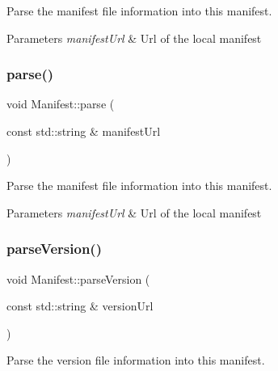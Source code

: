 Parse the manifest file information into this manifest. 


\begin{DoxyParams}{Parameters}
{\em manifest\+Url} & Url of the local manifest \\
\hline
\end{DoxyParams}
\mbox{\label{classManifest_abbaa9d1b3e86c2ff26d60a4d94209cd7}} 
\subsubsection{\texorpdfstring{parse()}{parse()}\hspace{0.1cm}{\footnotesize\ttfamily [2/2]}}
{\footnotesize\ttfamily void Manifest\+::parse (\begin{DoxyParamCaption}\item[{const std\+::string \&}]{manifest\+Url }\end{DoxyParamCaption})\hspace{0.3cm}{\ttfamily [protected]}}



Parse the manifest file information into this manifest. 


\begin{DoxyParams}{Parameters}
{\em manifest\+Url} & Url of the local manifest \\
\hline
\end{DoxyParams}
\mbox{\label{classManifest_adf48429fda66eba3c19db8fc09f7f6d2}} 
\subsubsection{\texorpdfstring{parse\+Version()}{parseVersion()}\hspace{0.1cm}{\footnotesize\ttfamily [1/2]}}
{\footnotesize\ttfamily void Manifest\+::parse\+Version (\begin{DoxyParamCaption}\item[{const std\+::string \&}]{version\+Url }\end{DoxyParamCaption})\hspace{0.3cm}{\ttfamily [protected]}}



Parse the version file information into this manifest. 


